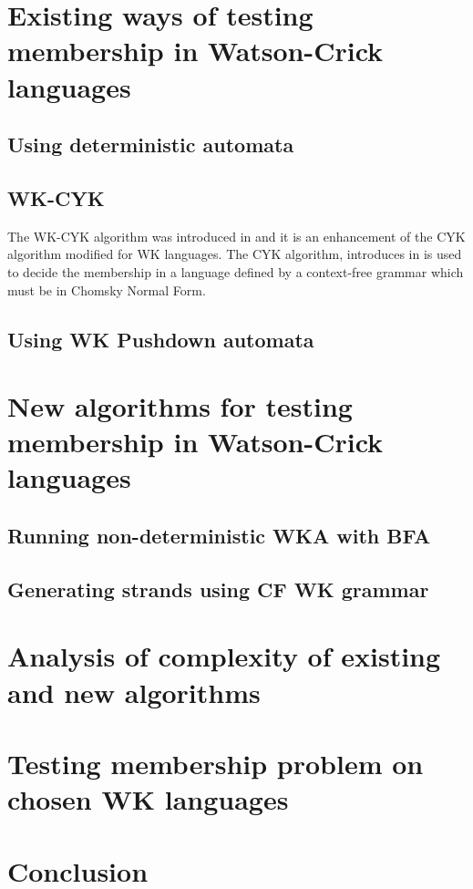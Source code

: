 \chapter{Existing ways of testing membership in Watson-Crick languages}

\section{Using deterministic automata}

\section{WK-CYK}
The WK-CYK algorithm was introduced in \cite{WK_CYK} and it is an enhancement of the CYK algorithm modified for WK languages. The CYK algorithm, introduces in  is used to decide the membership in a language defined by a context-free grammar which must be in Chomsky Normal Form.

\section{Using WK Pushdown automata}

\chapter{New algorithms for testing membership in Watson-Crick languages}

\section{Running non-deterministic WKA with BFA}

\section{Generating strands using CF WK grammar}

\chapter{Analysis of complexity of existing and new algorithms}

\chapter{Testing membership problem on chosen WK languages}

\chapter{Conclusion}
